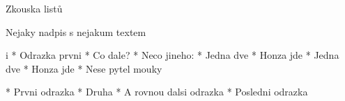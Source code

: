 
\chyph                    
\fontfam[Schola]

\tit Zkouska listů

\sec Nejaky nadpis s nejakum textem

\begitems \style i
* Odrazka prvni
* Co dale?
* Neco jineho:
\begitems
\begitems
* Jedna dve
* Honza jde
\enditems
* Jedna dve
* Honza jde
\enditems
* Nese pytel mouky
\enditems

\begitems
* Prvni odrazka
* Druha * A rovnou dalsi odrazka
* Posledni odrazka
\enditems

\bye
